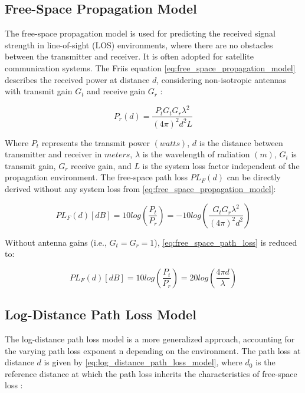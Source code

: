 \subsection{Free-Space Propagation Model}
The free-space propagation model is used for predicting the received signal strength in line-of-sight (LOS) environments, where there are no obstacles between the transmitter and receiver. It is often adopted for satellite communication systems. The Friis equation \ref{eq:free_space_propagation_model} describes the received power at distance $d$, considering non-isotropic antennas with transmit gain $G_t$ and receive gain $G_r$ \cite{cho2010mimo}:

\begin{equation}\label{eq:free_space_propagation_model}
    P_r\left(d\right)=\frac{P_tG_tG_r\lambda^2}{\left(4\pi\right)^2d^2L}
\end{equation}

    Where $P_t$ represents the transmit power $(watts)$, $d$ is the distance between transmitter and receiver in $meters$, $\lambda$ is the wavelength of radiation $(m)$, $G_t$ is transmit gain, $G_r$ receive gain, and $L$ is the system loss factor independent of the propagation environment. The free-space path loss ${PL}_F\left(d\right)$ can be directly derived without any system loss from \ref{eq:free_space_propagation_model}:

\begin{equation}\label{eq:free_space_path_loss}
    {PL}_F\left(d\right)\left[dB\right]=10log\left(\frac{P_t}{P_r}\right)=-10log\left(\frac{G_tG_r\lambda^2}{\left(4\pi\right)^2d^2}\right)
\end{equation}

Without antenna gains (i.e., $G_t=G_r=1$), \ref{eq:free_space_path_loss} is reduced to:

\begin{equation}\label{eq:free_space_path_loss_2}
    {PL}_F\left(d\right)\left[dB\right]=10log\left(\frac{P_t}{P_r}\right)=20log\left(\frac{4\pi d}{\lambda}\right)
\end{equation}

\subsection{Log-Distance Path Loss Model}
The log-distance path loss model is a more generalized approach, accounting for the varying path loss exponent n depending on the environment. The path loss at distance $d$ is given by \ref{eq:log_distance_path_loss_model}, where $d_0$ is the reference distance at which the path loss inherits the characteristics of free-space loss \cite{cho2010mimo}:

